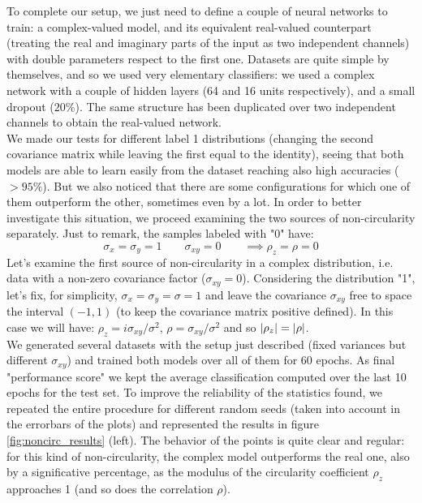 \documentclass[../main.tex]{subfiles}
\begin{document}
To complete our setup, we just need to define a couple of neural networks to train: a complex-valued model, and its equivalent real-valued counterpart (treating the real and imaginary parts of the input as two independent channels) with double parameters respect to the first one. Datasets are quite simple by themselves, and so we used very elementary classifiers: we used a complex network with a couple of hidden layers (64 and 16 units respectively), and a small dropout ($20\%$). The same structure has been duplicated over two independent channels to obtain the real-valued network.\\
We made our tests for different label 1 distributions (changing the second covariance matrix while leaving the first equal to the identity), seeing that both models are able to learn easily from the dataset reaching also high accuracies ($>95\%$). But we also noticed that there are some configurations for which one of them outperform the other, sometimes even by a lot. In order to better investigate this situation, we proceed examining the two sources of non-circularity separately. Just to remark, the samples labeled with "0" have:
\[ \sigma_x = \sigma_y = 1 \qquad \sigma_{xy}=0 \qquad \implies \rho_z= \rho = 0 \]
Let's examine the first source of non-circularity in a complex distribution, i.e. data with a non-zero covariance factor ($\sigma_{xy}=0$). Considering the distribution "1", let's fix, for simplicity, $\sigma_x=\sigma_y=\sigma=1$ and leave the covariance $\sigma_{xy}$ free to space the interval $(-1,1)$ (to keep the covariance matrix positive defined). In this case we will have: $\rho_z=i\sigma_{xy}/\sigma^2$, $\rho=\sigma_{xy}/\sigma^2$ and so $\abs{\rho_z}=\abs{\rho}$.\\
We generated several datasets with the setup just described (fixed variances but different $\sigma_{xy}$) and trained both models over all of them for 60 epochs. As final "performance score" we kept the average classification computed over the last 10 epochs for the test set. To improve the reliability of the statistics found, we repeated the entire procedure for different random seeds (taken into account in the errorbars of the plots) and represented the results in figure \ref{fig:noncirc_results} (left). The behavior of the points is quite clear and regular: for this kind of non-circularity, the complex model outperforms the real one, also by a significative percentage, as the modulus of the circularity coefficient $\rho_z$ approaches 1 (and so does the correlation $\rho$).\\
\end{document}

